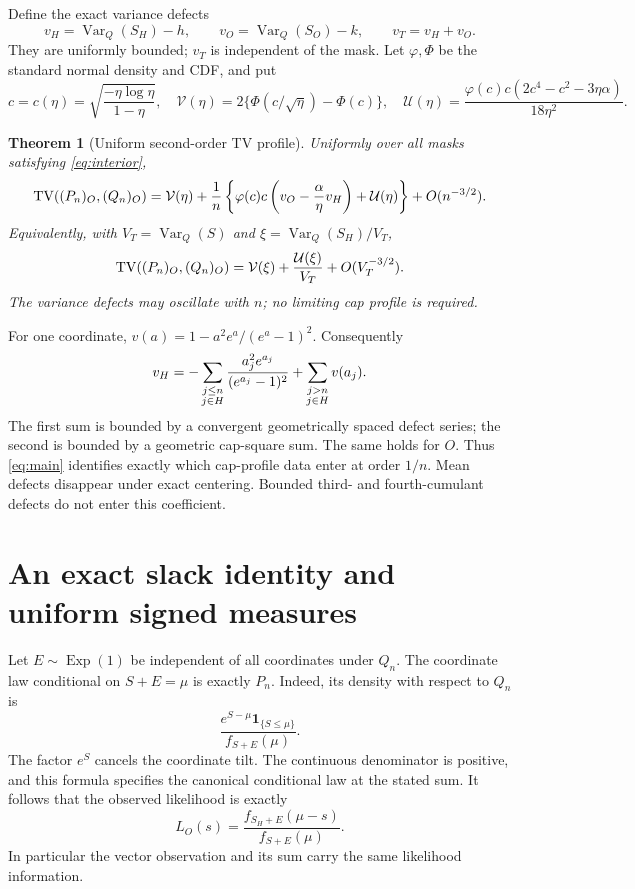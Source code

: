\documentclass[11pt,a4paper]{article}
\newtheorem{theorem}{Theorem}[section]\newtheorem{lemma}[theorem]{Lemma}
\theoremstyle{remark}\newtheorem*{ednote}{Editorial note (ProveIt, 2026-10-01)}
\newcommand{\Var}{\operatorname{Var}}\newcommand{\Law}{\operatorname{Law}}\newcommand{\KL}{\operatorname{KL}}
\newcommand{\ind}{\mathbf1}\newcommand{\dd}{\,\mathrm d}\newcommand{\ph}{\varphi}
\begin{document}
Define the exact variance defects
\[
 v_H=\Var_Q(S_H)-h,\qquad v_O=\Var_Q(S_O)-k,
 \qquad v_T=v_H+v_O.
\]
They are uniformly bounded; $v_T$ is independent of the mask. Let $\ph,\Phi$ be the standard normal density and CDF, and put
\begin{equation}\label{eq:profiles}
 c=c(\eta)=\sqrt{\frac{-\eta\log\eta}{1-\eta}},\quad
 \mathcal V(\eta)=2\{\Phi(c/\sqrt\eta)-\Phi(c)\},\quad
 \mathcal U(\eta)=\frac{\ph(c)c(2c^4-c^2-3\eta\alpha)}{18\eta^2}.
\end{equation}

\begin{theorem}[Uniform second-order TV profile]\label{thm:main}
Uniformly over all masks satisfying \eqref{eq:interior},
\begin{equation}\label{eq:main}
 \TV((P_n)_O,(Q_n)_O)
 =\mathcal V(\eta)+\frac1n
 \left\{\ph(c)c\left(v_O-\frac\alpha\eta v_H\right)
             +\mathcal U(\eta)\right\}+O(n^{-3/2}).
\end{equation}
Equivalently, with $V_T=\Var_Q(S)$ and $\xi=\Var_Q(S_H)/V_T$,
\begin{equation}\label{eq:varianceform}
 \operatorname{TV}((P_n)_O,(Q_n)_O)
 =\mathcal V(\xi)+\frac{\mathcal U(\xi)}{V_T}+O(V_T^{-3/2}).
\end{equation}
The variance defects may oscillate with $n$; no limiting cap profile is required.
\end{theorem}

For one coordinate, $v(a)=1-a^2e^a/(e^a-1)^2$. Consequently
\begin{equation}\label{eq:defect}
 v_H=-\sum_{\substack{j\le n\cr j\in H}}
       \frac{a_j^2e^{a_j}}{(e^{a_j}-1)^2}
       +\sum_{\substack{j>n\cr j\in H}}v(a_j).
\end{equation}
The first sum is bounded by a convergent geometrically spaced defect series; the second is bounded by a geometric cap-square sum. The same holds for $O$. Thus \eqref{eq:main} identifies exactly which cap-profile data enter at order $1/n$. Mean defects disappear under exact centering. Bounded third- and fourth-cumulant defects do not enter this coefficient.

\section{An exact slack identity and uniform signed measures}
Let $E\sim\operatorname{Exp}(1)$ be independent of all coordinates under $Q_n$. The coordinate law conditional on $S+E=\mu$ is exactly $P_n$. Indeed, its density with respect to $Q_n$ is
\[
 \frac{e^{S-\mu}\ind_{\{S\le\mu\}}}{f_{S+E}(\mu)}.
\]
The factor $e^S$ cancels the coordinate tilt. The continuous denominator is positive, and this formula specifies the canonical conditional law at the stated sum. It follows that the observed likelihood is exactly
\begin{equation}\label{eq:slack}
 L_O(s)=\frac{f_{S_H+E}(\mu-s)}{f_{S+E}(\mu)}.
\end{equation}
In particular the vector observation and its sum carry the same likelihood information.
\end{document}
